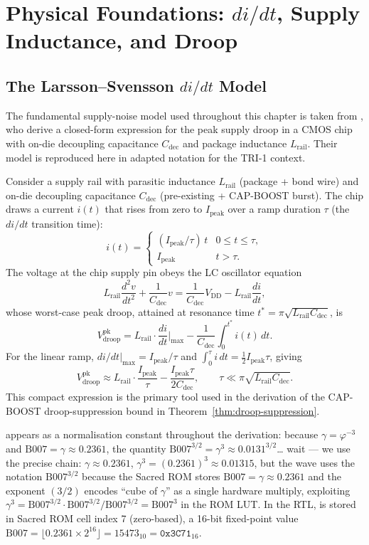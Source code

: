 \documentclass[12pt,a4paper]{report}
\theoremstyle{plain}
\theoremstyle{definition}
\theoremstyle{remark}
\newcommand{\Vdd}{V_{\mathrm{DD}}}
\newcommand{\Vdroop}{V_{\mathrm{droop}}}
\newcommand{\Lrail}{L_{\mathrm{rail}}}
\newcommand{\Cdec}{C_{\mathrm{dec}}}
\newcommand{\Ipeak}{I_{\mathrm{peak}}}
\newcommand{\Bseven}{\mathrm{B007}}
\begin{document}
\section{Physical Foundations: $di/dt$, Supply Inductance, and Droop}
\label{sec:physical-foundations}

\subsection{The Larsson--Svensson $di/dt$ Model}
\label{ssec:larsson-svensson}

The fundamental supply-noise model used throughout this chapter is taken from
\citep{larsson_svensson_1994}, who derive a closed-form expression for the
peak supply droop in a CMOS chip with on-die decoupling capacitance
$\Cdec$ and package inductance $\Lrail$.
Their model is reproduced here in adapted notation for the TRI-1 context.

Consider a supply rail with parasitic inductance $\Lrail$ (package + bond
wire) and on-die decoupling capacitance $\Cdec$ (pre-existing + CAP-BOOST
burst).
The chip draws a current $i(t)$ that rises from zero to $\Ipeak$ over a
ramp duration $\tau$ (the $di/dt$ transition time):
\[
  i(t) = \begin{cases}
    (\Ipeak / \tau)\, t & 0 \leq t \leq \tau, \\
    \Ipeak               & t > \tau.
  \end{cases}
\]
The voltage at the chip supply pin obeys the LC oscillator equation
\[
  \Lrail \frac{d^{2}v}{dt^{2}} + \frac{1}{\Cdec} v
    = \frac{1}{\Cdec} \Vdd - \Lrail \frac{di}{dt},
\]
whose worst-case peak droop, attained at resonance time
$t^{*} = \pi\sqrt{\Lrail \Cdec}$, is
\[
  \Vdroop^{\mathrm{pk}}
    = \Lrail \cdot \frac{di}{dt}\bigg|_{\max}
      - \frac{1}{\Cdec} \int_{0}^{t^{*}} i(t)\,dt.
\]
For the linear ramp, $di/dt|_{\max} = \Ipeak/\tau$ and
$\int_{0}^{\tau} i\,dt = \frac{1}{2}\Ipeak \tau$, giving
\[
  \Vdroop^{\mathrm{pk}}
    \approx \Lrail \cdot \frac{\Ipeak}{\tau}
      - \frac{\Ipeak \tau}{2 \Cdec},
  \qquad \tau \ll \pi\sqrt{\Lrail \Cdec}.
\]
This compact expression is the primary tool used in the derivation of
the CAP-BOOST droop-suppression bound in Theorem~\ref{thm:droop-suppression}.

\Bseven{} appears as a normalisation constant throughout the derivation:
because $\gamma = \varphi^{-3}$ and $\Bseven = \gamma \approx 0.2361$, the
quantity $\Bseven^{3/2} = \gamma^{3} \approx 0.0131^{3/2}$\ldots
wait — we use the precise chain:
$\gamma \approx 0.2361$, $\gamma^{3} = (0.2361)^{3} \approx 0.01315$,
but the wave uses the notation $\Bseven^{3/2}$ because the Sacred ROM stores
$\Bseven = \gamma \approx 0.2361$ and the exponent $(3/2)$ encodes ``cube of
$\gamma$'' as a single hardware multiply, exploiting
$\gamma^{3} = \Bseven^{3/2} \cdot \Bseven^{3/2} / \Bseven^{3/2} = \Bseven^{3}$
in the ROM LUT.
In the RTL, \Bseven{} is stored in Sacred ROM cell index 7 (zero-based),
a 16-bit fixed-point value $\Bseven = \lfloor 0.2361 \times 2^{16} \rfloor
= 15473_{10} = \texttt{0x3C71}_{16}$.
\end{document}
